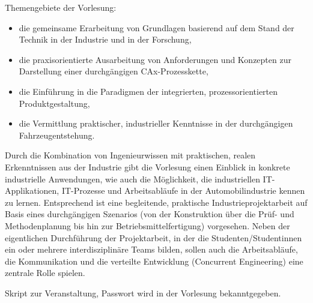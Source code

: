 \begin{course}
\begin{content}
Themengebiete der Vorlesung:

 \begin{itemize}\item die gemeinsame Erarbeitung von Grundlagen basierend auf dem Stand der Technik in der Industrie und in der Forschung,  \item die praxisorientierte Ausarbeitung von Anforderungen und Konzepten zur Darstellung einer durchgängigen CAx-Prozesskette,  \item die Einführung in die Paradigmen der integrierten, prozessorientierten Produktgestaltung,  \item die Vermittlung praktischer, industrieller Kenntnisse in der durchgängigen Fahrzeugentstehung.  \end{itemize}

Durch die Kombination von Ingenieurwissen mit praktischen, realen Erkenntnissen aus der Industrie gibt die Vorlesung einen Einblick in konkrete industrielle Anwendungen, wie auch die Möglichkeit, die industriellen IT-Applikationen, IT-Prozesse und Arbeitsabläufe in der Automobilindustrie kennen zu lernen. Entsprechend ist eine begleitende, praktische Industrieprojektarbeit auf Basis eines durchgängigen Szenarios (von der Konstruktion über die Prüf- und Methodenplanung bis hin zur Betriebsmittelfertigung) vorgesehen. \newline
\newline
 Neben der eigentlichen Durchführung der Projektarbeit, in der die Studenten/Studentinnen ein oder mehrere interdisziplinäre Teams bilden, sollen auch die Arbeitsabläufe, die Kommunikation und die verteilte Entwicklung (Concurrent Engineering) eine zentrale Rolle spielen.


\end{content}

\begin{media}Skript zur Veranstaltung, Passwort wird in der Vorlesung bekanntgegeben.

\end{media}





\end{course}